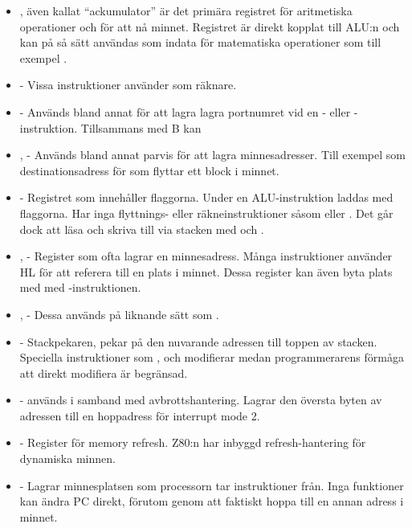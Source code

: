 \documentclass[main.tex]{subfiles}
\begin{document}
\begin{itemize}
    \item {}, även kallat ``ackumulator'' är det primära registret för
        aritmetiska operationer och för att nå minnet. Registret är direkt
        kopplat till ALU:n och kan på så sätt användas som indata för
        matematiska operationer som till exempel .
    \item {} - Vissa instruktioner använder  som räknare.
    \item {} - Används bland annat för att lagra lagra portnumret vid en
        - eller -instruktion. Tillsammans med B kan
    \item {},  - Används bland annat parvis för att lagra
        minnesadresser. Till exempel som destinationsadress för 
        som flyttar ett block i minnet.
    \item {} - Registret som innehåller flaggorna. Under en
        ALU-instruktion laddas  med flaggorna. Har inga flyttnings-
        eller räkneinstruktioner såsom  eller . Det går dock
        att läsa och skriva till  via stacken med  och
        .
    \item {},  - Register som ofta lagrar en minnesadress. Många instruktioner
        använder HL för att referera till en plats i minnet. Dessa register kan
        även byta plats med  med -instruktionen.
    \item {},  - Dessa används på liknande sätt som .
    \item {} - Stackpekaren, pekar på den nuvarande adressen till toppen av
        stacken. Speciella instruktioner som ,  och
         modifierar  medan programmerarens förmåga att
        direkt modifiera  är begränsad.
    \item {} -  används i samband med avbrottshantering. Lagrar
        den översta byten av adressen till en hoppadress för interrupt mode
        2.
    \item {} - Register för memory refresh. Z80:n har inbyggd
        refresh-hantering för dynamiska minnen.
    \item {} - Lagrar minnesplatsen som processorn tar instruktioner från. Inga
        funktioner kan ändra PC direkt, förutom genom att faktiskt hoppa till
        en annan adress i minnet.
\end{itemize}
\end{document}
